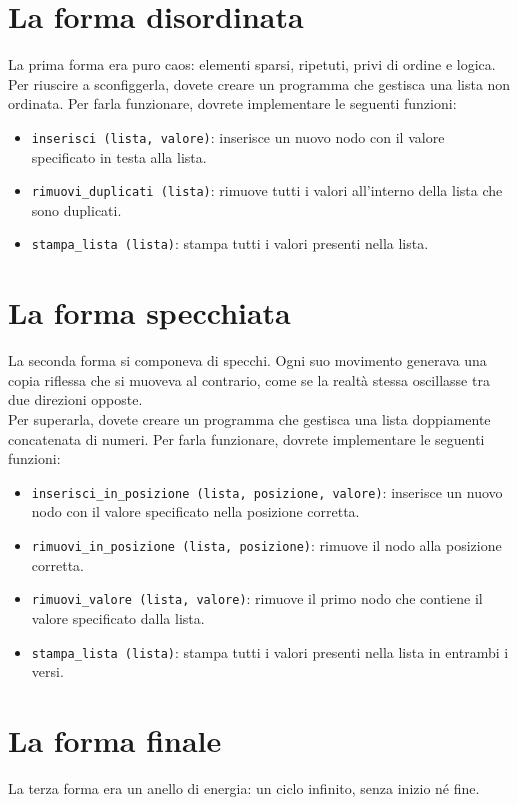 \documentclass[a4paper]{article}
\begin{document}
\section*{La forma disordinata}
La prima forma era puro caos: elementi sparsi, ripetuti, privi di ordine e logica.\\
Per riuscire a sconfiggerla, dovete creare un programma che gestisca una lista non ordinata.
Per farla funzionare, dovrete implementare le seguenti funzioni:
\begin{itemize}
    \item \texttt{inserisci (lista, valore)}: inserisce un nuovo nodo con il valore specificato in testa alla lista.
    \item \texttt{rimuovi\_duplicati (lista)}: rimuove tutti i valori all'interno della lista che sono duplicati.
    \item \texttt{stampa\_lista (lista)}: stampa tutti i valori presenti nella lista.
\end{itemize}

\section*{La forma specchiata}
La seconda forma si componeva di specchi. Ogni suo movimento generava una copia riflessa che si muoveva al contrario, come se la realtà stessa oscillasse tra due direzioni opposte.\\
Per superarla, dovete creare un programma che gestisca una lista doppiamente concatenata di numeri. Per farla funzionare, dovrete implementare le seguenti funzioni:
\begin{itemize}
    \item \texttt{inserisci\_in\_posizione (lista, posizione, valore)}: inserisce un nuovo nodo con il valore specificato nella posizione corretta.
    \item \texttt{rimuovi\_in\_posizione (lista, posizione)}: rimuove il nodo alla posizione corretta.
    \item \texttt{rimuovi\_valore (lista, valore)}: rimuove il primo nodo che contiene il valore specificato dalla lista.
    \item \texttt{stampa\_lista (lista)}: stampa tutti i valori presenti nella lista in entrambi i versi.
\end{itemize}

\section*{La forma finale}
La terza forma era un anello di energia: un ciclo infinito, senza inizio né fine.
\end{document}
